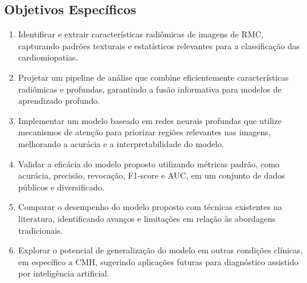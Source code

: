 \subsection{Objetivos Específicos}
\label{subsec:cap1_objetivo_especific}

\begin{enumerate}
\item Identificar e extrair características radiômicas de imagens de \gls{RMC}, capturando padrões texturais e estatísticos relevantes para a classificação das cardiomiopatias.

\item Projetar um pipeline de análise que combine eficientemente características radiômicas e profundas, garantindo a fusão informativa para modelos de aprendizado profundo.

\item Implementar um modelo baseado em redes neurais profundas que utilize mecanismos de atenção para priorizar regiões relevantes nas imagens, melhorando a acurácia e a interpretabilidade do modelo.

\item Validar a eficácia do modelo proposto utilizando métricas padrão, como acurácia, precisão, revocação, F1-score e AUC, em um conjunto de dados públicos e diversificado.

\item Comparar o desempenho do modelo proposto com técnicas existentes na literatura, identificando avanços e limitações em relação às abordagens tradicionais.

\item Explorar o potencial de generalização do modelo em outras condições clínicas, em específico a \gls{CMH}, sugerindo aplicações futuras para diagnóstico assistido por inteligência artificial.
\end{enumerate}




